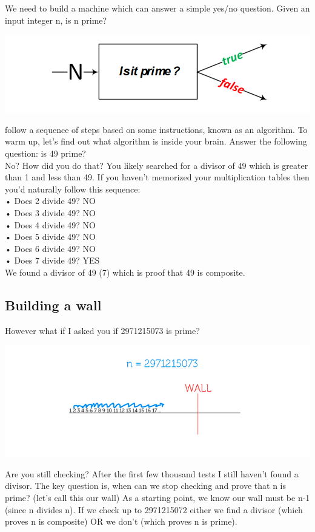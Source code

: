 \documentclass{report}
\begin{document}
We need to build a machine which can answer a simple yes/no question. Given an input integer n, is n prime?
\begin{center}
	\includegraphics[scale=1]{42.png}
\end{center}
follow a sequence of steps based on some instructions, known as an algorithm. To warm up, let's find out what algorithm is inside your brain. Answer the following question: is 49 prime?\\
No? How did you do that? You likely searched for a divisor of 49 which is greater than 1 and less than 49. If you haven't memorized your multiplication tables then you'd naturally follow this sequence:\\
•	Does 2 divide 49?     NO\\
•	Does 3 divide 49?     NO\\
•	Does 4 divide 49?     NO\\
•	Does 5 divide 49?     NO\\
•	Does 6 divide 49?     NO\\
•	Does 7 divide 49?    YES\\
We found a divisor of 49 (7) which is proof that 49 is composite.

\subsection{Building a wall}
However what if I asked you if 2971215073 is prime?
\begin{center}
	\includegraphics[scale=1]{43.png}
\end{center}
Are you still checking? After the first few thousand tests I still haven't found a divisor. The key question is, when can we stop checking and prove that n is prime? (let's call this our wall) As a starting point, we know our wall must be n-1 (since n divides n). If we check up to 2971215072 either we find a divisor (which proves n is composite) OR we don't (which proves n is prime).
\end{document}
